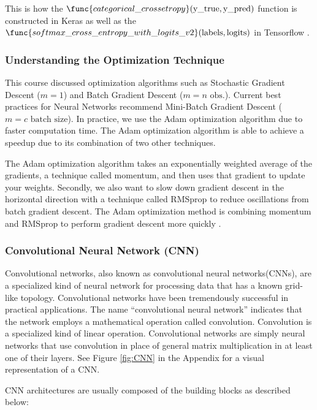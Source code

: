 \documentclass[11pt]{article}
\begin{document}
This is how the $\func{categorical\_crossetropy}(\text{y\_true}, \text{y\_pred})$ function is constructed in Keras \cite{chollet2015keras} as well as the
$\func{softmax\_cross\_entropy\_with\_logits\_v2}(\text{labels}, \text{logits})$ in Tensorflow \cite{tensorflow2015-whitepaper}. 

\subsubsection{Understanding the Optimization Technique}

This course discussed optimization algorithms such as Stochastic Gradient
Descent ($m =1$) and Batch Gradient Descent ($m=n \text{ obs.}$). Current
best practices for Neural Networks recommend Mini-Batch Gradient Descent
($m = c \text{ batch size}$). In practice, we use the Adam optimization
algorithm due to faster computation time. The Adam optimization algorithm
is able to achieve a speedup due to its combination of two other techniques.

The Adam optimization algorithm takes an exponentially weighted average of
the gradients, a technique called momentum, and then uses that gradient to
update your weights. Secondly, we also want to slow down gradient descent in
the horizontal direction with a technique called RMSprop to reduce
oscillations from batch gradient descent. The Adam optimization method is
combining momentum and RMSprop to perform gradient descent more quickly
\cite{DeepLear51:online}.

\subsubsection{Convolutional Neural Network (CNN)}

Convolutional networks, also known as convolutional neural networks(CNNs),
are a specialized kind of neural network for processing data that has a
known grid-like topology. Convolutional networks have been tremendously
successful in practical applications. The name “convolutional neural network”
indicates that the network employs a mathematical operation called
convolution. Convolution is a specialized kind of linear operation.
Convolutional networks are simply neural networks that use convolution
in place of general matrix multiplication in at least one of their layers. See
Figure \ref{fig:CNN} in the Appendix for a visual representation of a CNN.

CNN architectures are usually composed of the building blocks as described
below:
\end{document}
